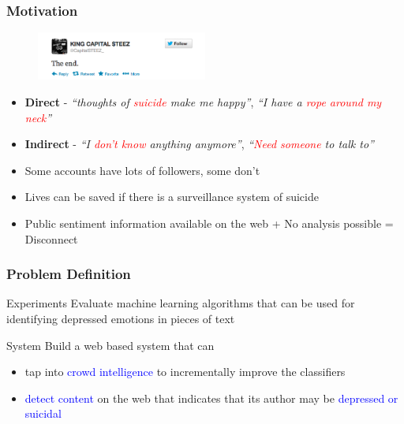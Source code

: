 \documentclass[xcolor=table]{beamer}
\begin{document}
    \begin{frame}
        \frametitle{Motivation}
        \begin{figure}
            \centering
            \includegraphics[width=0.5\textwidth]{figures/twitter_kcs.png}
        \end{figure}
        \begin{itemize}
            \item{\textbf{Direct} - \emph{``thoughts of \textcolor{red}{suicide} make me happy''}, \emph{``I have a \textcolor{red}{rope around my neck}''}}
            \item{\textbf{Indirect} - \emph{``I \textcolor{red}{don't know} anything anymore''}, \emph{``\textcolor{red}{Need someone} to talk to''}}
            \pause
            \item{Some accounts have lots of followers, some don't}
            \item{Lives can be saved if there is a surveillance system of suicide}
            \item{Public sentiment information available on the web + No analysis possible = Disconnect}
        \end{itemize}
    \end{frame}
    
    \begin{frame}
        \frametitle{Problem Definition}
        \begin{block}{Experiments}
            Evaluate machine learning algorithms that can be used for identifying depressed emotions in pieces of text
        \end{block}
        \begin{block}{System}
            Build a web based system that can
            \begin{itemize}
                \item{tap into \textcolor{blue}{crowd intelligence} to incrementally improve the classifiers}
                \item{\textcolor{blue}{detect content} on the web that indicates that its author may be \textcolor{blue}{depressed or suicidal}}
            \end{itemize}
        \end{block}
    \end{frame}
    
\end{document}
